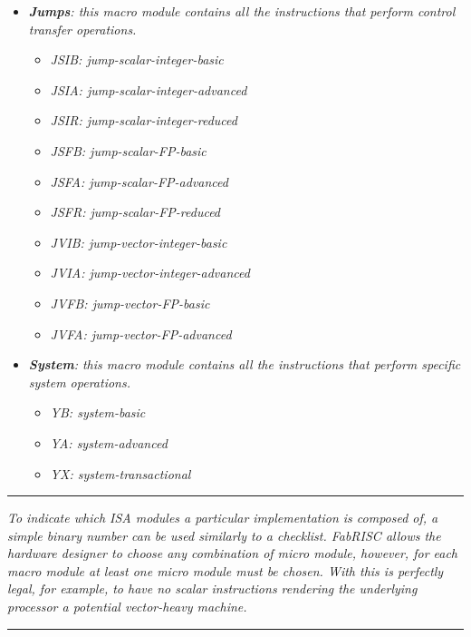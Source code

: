 \documentclass{article}
\begin{document}
\begin{itemize}
\begin{itemize}
                \end{itemize}

           \item \textit{\textbf{Jumps}: this macro module contains all the instructions that perform control transfer operations.}

                \begin{itemize}

                   \item \textit{JSIB: jump-scalar-integer-basic}
                   \item \textit{JSIA: jump-scalar-integer-advanced}
                   \item \textit{JSIR: jump-scalar-integer-reduced}
                   \item \textit{JSFB: jump-scalar-FP-basic}
                   \item \textit{JSFA: jump-scalar-FP-advanced}
                   \item \textit{JSFR: jump-scalar-FP-reduced}
                   \item \textit{JVIB: jump-vector-integer-basic}
                   \item \textit{JVIA: jump-vector-integer-advanced}
                   \item \textit{JVFB: jump-vector-FP-basic}
                   \item \textit{JVFA: jump-vector-FP-advanced}

                \end{itemize}

           \item \textit{\textbf{System}: this macro module contains all the instructions that perform specific system operations.}

                \begin{itemize}

                    \item \textit{YB: system-basic}
                    \item \textit{YA: system-advanced}
                    \item \textit{YX: system-transactional}

                \end{itemize}

        \end{itemize}

        \par\noindent\rule{\textwidth}{0.4pt}
        \textit{To indicate which ISA modules a particular implementation is composed of, a simple binary number can be used similarly to a checklist. FabRISC allows the hardware designer to choose any combination of micro module, however, for each macro module at least one micro module must be chosen. With this is perfectly legal, for example, to have no scalar instructions rendering the underlying processor a potential vector-heavy machine.}
        \par\noindent\rule{\textwidth}{0.4pt}
\end{document}
